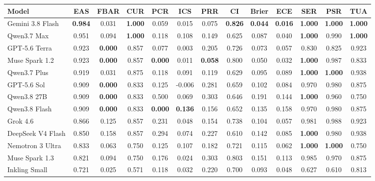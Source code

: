 \begin{tabular}{lcccccccccccc}
\toprule
Model & EAS & FBAR & CUR & PCR & ICS & PRR & CI & Brier & ECE & SER & PSR & TUA \\
\midrule
Gemini 3.8 Flash & \textbf{0.984} & 0.031 & \textbf{1.000} & 0.059 & 0.015 & 0.075 & \textbf{0.826} & \textbf{0.044} & \textbf{0.016} & \textbf{1.000} & \textbf{1.000} & \textbf{1.000} \\
Qwen3.7 Max & 0.951 & 0.094 & \textbf{1.000} & 0.118 & 0.108 & 0.149 & 0.625 & 0.087 & 0.040 & \textbf{1.000} & 0.990 & \textbf{1.000} \\
GPT-5.6 Terra & 0.923 & \textbf{0.000} & 0.857 & 0.077 & 0.003 & 0.205 & 0.726 & 0.073 & 0.057 & 0.830 & 0.825 & 0.923 \\
Muse Spark 1.2 & 0.923 & \textbf{0.000} & 0.857 & \textbf{0.000} & 0.011 & \textbf{0.058} & 0.800 & 0.050 & 0.032 & \textbf{1.000} & 0.987 & 0.833 \\
Qwen3.7 Plus & 0.919 & 0.031 & 0.875 & 0.118 & 0.091 & 0.119 & 0.629 & 0.095 & 0.089 & \textbf{1.000} & \textbf{1.000} & 0.938 \\
GPT-5.6 Sol & 0.909 & \textbf{0.000} & 0.833 & 0.125 & -0.006 & 0.281 & 0.659 & 0.102 & 0.084 & 0.970 & 0.980 & 0.875 \\
Qwen3.8 27B & 0.909 & \textbf{0.000} & 0.833 & 0.500 & 0.069 & 0.303 & 0.646 & 0.191 & 0.144 & \textbf{1.000} & 0.960 & 0.750 \\
Qwen3.8 Flash & 0.909 & \textbf{0.000} & 0.833 & \textbf{0.000} & \textbf{0.136} & 0.156 & 0.652 & 0.135 & 0.158 & 0.970 & 0.980 & 0.875 \\
Grok 4.6 & 0.866 & 0.125 & 0.857 & 0.231 & 0.048 & 0.154 & 0.738 & 0.104 & 0.057 & 0.981 & 0.988 & 0.923 \\
DeepSeek V4 Flash & 0.850 & 0.158 & 0.857 & 0.294 & 0.074 & 0.227 & 0.610 & 0.142 & 0.085 & \textbf{1.000} & 0.980 & 0.938 \\
Nemotron 3 Ultra & 0.833 & 0.063 & 0.750 & 0.125 & 0.107 & 0.182 & 0.721 & 0.115 & 0.062 & \textbf{1.000} & \textbf{1.000} & 0.750 \\
Muse Spark 1.3 & 0.821 & 0.094 & 0.750 & 0.176 & 0.024 & 0.303 & 0.803 & 0.151 & 0.113 & 0.985 & 0.970 & 0.875 \\
Inkling Small & 0.721 & 0.025 & 0.571 & 0.118 & 0.032 & 0.220 & 0.700 & 0.093 & 0.048 & 0.627 & 0.610 & 0.813 \\
\bottomrule
\end{tabular}
